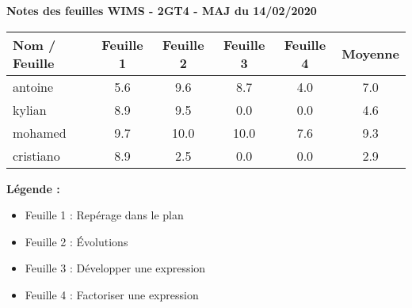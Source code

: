\documentclass[12pt,a4paper]{article}
\begin{document}
\thispagestyle{empty}
\large
\begin{center}
\textbf{Notes des feuilles WIMS - 2GT4 - MAJ du 14/02/2020}
\end{center}

\begin{center} 
\begin{tabular}{|l|*{5}{c|}} 
\hline 
\textbf{Nom / Feuille} & Feuille 1 & Feuille 2 & Feuille 3 & Feuille 4 & {\color{red} Moyenne } \\ 
\hline 
antoine & 5.6 & 9.6 & 8.7 & 4.0 & { \color{red} 7.0 } \\ 
\hline 
kylian & 8.9 & 9.5 & 0.0 & 0.0 & { \color{red} 4.6 } \\ 
\hline 
mohamed & 9.7 & 10.0 & 10.0 & 7.6 & { \color{red} 9.3 } \\ 
\hline 
cristiano & 8.9 & 2.5 & 0.0 & 0.0 & { \color{red} 2.9 } \\ 
\hline 
\end{tabular} 
\end{center} 
 
\textbf{{Légende : }} 
\begin{itemize} 
 \item Feuille 1 : Repérage dans le plan 
 \item Feuille 2 : Évolutions 
 \item Feuille 3 : Développer une expression 
 \item Feuille 4 : Factoriser une expression 
\end{itemize}
\end{document}
